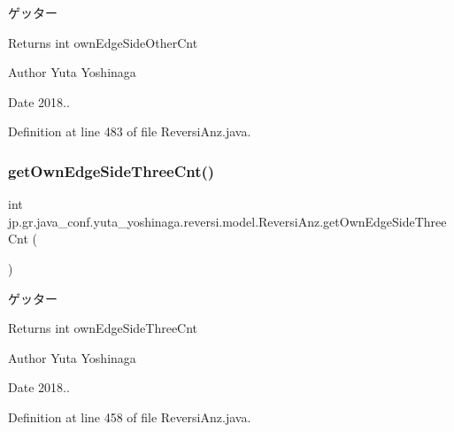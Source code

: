 ゲッター 

\begin{DoxyReturn}{Returns}
int own\+Edge\+Side\+Other\+Cnt 
\end{DoxyReturn}
\begin{DoxyAuthor}{Author}
Yuta Yoshinaga 
\end{DoxyAuthor}
\begin{DoxyDate}{Date}
2018.. 
\end{DoxyDate}


Definition at line 483 of file Reversi\+Anz.\+java.

\mbox{\label{classjp_1_1gr_1_1java__conf_1_1yuta__yoshinaga_1_1reversi_1_1model_1_1_reversi_anz_a740171debdb292e8cce2793803b8292e}} 
\subsubsection{\texorpdfstring{get\+Own\+Edge\+Side\+Three\+Cnt()}{getOwnEdgeSideThreeCnt()}}
{\footnotesize\ttfamily int jp.\+gr.\+java\+\_\+conf.\+yuta\+\_\+yoshinaga.\+reversi.\+model.\+Reversi\+Anz.\+get\+Own\+Edge\+Side\+Three\+Cnt (\begin{DoxyParamCaption}{ }\end{DoxyParamCaption})}



ゲッター 

\begin{DoxyReturn}{Returns}
int own\+Edge\+Side\+Three\+Cnt 
\end{DoxyReturn}
\begin{DoxyAuthor}{Author}
Yuta Yoshinaga 
\end{DoxyAuthor}
\begin{DoxyDate}{Date}
2018.. 
\end{DoxyDate}


Definition at line 458 of file Reversi\+Anz.\+java.

